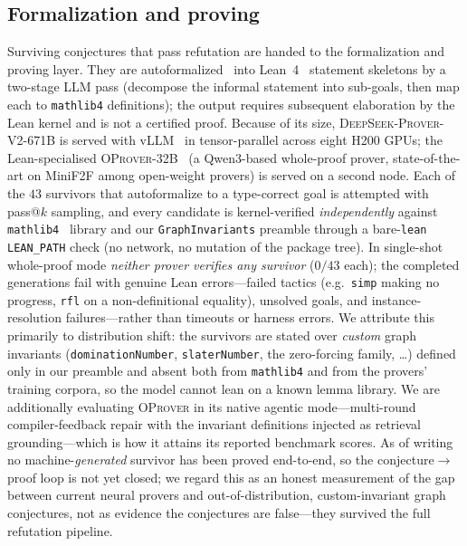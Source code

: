 \documentclass[]{ceurart}
\begin{document}
\subsection{Formalization and proving}
\label{sec:formalize-prove}
Surviving conjectures that pass refutation are handed to the formalization and proving layer.
They are autoformalized~\cite{wu2022autoformalization} into Lean~4~\cite{moura2015lean}
statement skeletons by a two-stage LLM pass (decompose the informal statement
into sub-goals, then map each to \texttt{mathlib4} definitions); the output requires subsequent
elaboration by the Lean kernel and is not a certified proof. Because of its size, \textsc{DeepSeek-Prover-V2-671B} is served with vLLM~\cite{kwon2023vllm} in
tensor-parallel across eight H200 GPUs; the Lean-specialised \textsc{OProver-32B}~\cite{oprover2026} (a
Qwen3-based whole-proof prover, state-of-the-art on MiniF2F among open-weight provers) is served on a
second node. Each of the $43$ survivors that autoformalize to a type-correct goal is attempted with
pass@$k$ sampling, and every candidate is kernel-verified \emph{independently} against
\texttt{mathlib4}~\cite{vandoorn2020maintaining} library and our \texttt{GraphInvariants} preamble through a
bare-\texttt{lean} \texttt{LEAN\_PATH} check (no network, no mutation of the package tree). In single-shot
whole-proof mode \emph{neither prover verifies any survivor} ($0/43$ each); the completed generations fail
with genuine Lean errors---failed tactics (e.g.\ \texttt{simp} making no progress, \texttt{rfl} on a
non-definitional equality), unsolved goals, and instance-resolution failures---rather than timeouts or
harness errors. We attribute this primarily to distribution shift: the survivors are stated over
\emph{custom} graph invariants (\texttt{dominationNumber}, \texttt{slaterNumber}, the zero-forcing family,
\dots) defined only in our preamble and absent both from \texttt{mathlib4} and from the provers' training
corpora, so the model cannot lean on a known lemma library. We are additionally evaluating
\textsc{OProver} in its native agentic mode---multi-round compiler-feedback repair with the invariant
definitions injected as retrieval grounding---which is how it attains its reported benchmark scores. As of
writing no machine-\emph{generated} survivor has been proved end-to-end, so the conjecture$\to$proof loop
is not yet closed; we regard this as an honest measurement of the gap between current neural provers and
out-of-distribution, custom-invariant graph conjectures, not as evidence the conjectures are false---they
survived the full refutation pipeline.
\end{document}
